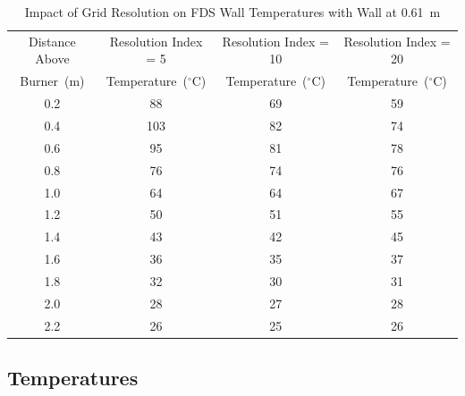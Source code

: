 \documentclass[twoside]{uocthesis}
\begin{document}
\begin{table}
	\small
	\centering
	\begin{tabular}{|c|c|c|c|}
		\hline Distance Above  & Resolution Index = 5      & Resolution Index = 10     & Resolution Index = 20 \\
		Burner~(m)	   & Temperature~($^{\circ}$C) & Temperature~($^{\circ}$C) & Temperature~($^{\circ}$C)	\\ \hline
		\hline 0.2 			   & 88						   & 69						& 59 			 	\\
		\hline 0.4			   & 103					   & 82						& 74			 	\\
		\hline 0.6			   & 95						   & 81						& 78			 	\\
		\hline 0.8			   & 76						   & 74						& 76				\\
		\hline 1.0			   & 64						   & 64 					& 67				\\
		\hline 1.2			   & 50						   & 51 					& 55				\\
		\hline 1.4			   & 43						   & 42 					& 45				\\
		\hline 1.6			   & 36						   & 35 					& 37				\\
		\hline 1.8			   & 32						   & 30 					& 31				\\
		\hline 2.0			   & 28						   & 27 					& 28				\\
		\hline 2.2			   & 26						   & 25 					& 26				\\
		\hline
	\end{tabular}
	\caption[Impact of Grid Resolution on FDS Wall Temperatures with Wall at 0.61~m]{Impact of Grid Resolution on FDS Wall Temperatures with Wall at 0.61~m}
	\label{tab:FDSRI_wall2D}
\end{table}

\subsection{Temperatures}
\end{document}
